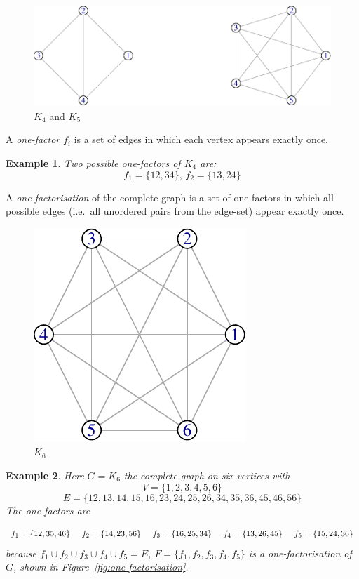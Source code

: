 \documentclass[
  12pt,
  a4paper]{book}
\newtheorem{example}{Example}
\begin{document}
\begin{figure}
\centering
\includegraphics{figure/complete-graph-1.pdf}
\caption{\label{fig:complete-graph}\(K_4\) and \(K_5\)}
\end{figure}

A \emph{one-factor} \(f_i\) is a set of edges in which each vertex appears
exactly once.

\begin{example}
Two possible one-factors of
$K_4$
are:
$$f_1 = \{12,34\},\, f_2 = \{13,24\}$$
\end{example}

A \emph{one-factorisation} of the complete graph is a set of one-factors
in which all possible edges (i.e.~all unordered pairs from the edge-set)
appear exactly once.

\begin{figure}
\centering
\includegraphics{figure/K6-1.pdf}
\caption{\label{fig:K6}\(K_6\)}
\end{figure}

\begin{example}
Here
$G = K_6$
the complete graph on six vertices with
$$V = \{1, 2, 3, 4, 5, 6\}$$
$$E = \{12, 13, 14, 15, 16, 23, 24, 25, 26, 34, 35, 36, 45, 46, 56\}$$
The one-factors are

$$
f_1 = \{12, 35, 46\} \hspace{0.5cm}
f_2 = \{14, 23, 56\} \hspace{0.5cm}
f_3 = \{16, 25, 34\} \hspace{0.5cm}
f_4 = \{13, 26, 45\} \hspace{0.5cm} 
f_5 = \{15, 24, 36\}
$$
because
$f_1 \cup f_2 \cup f_3 \cup f_4 \cup f_5 = E$,
$F = \{f_1, f_2, f_3, f_4, f_5\}$
is a one-factorisation of
$G$,
shown in Figure~\ref{fig:one-factorisation}.
\end{example}
\end{document}
